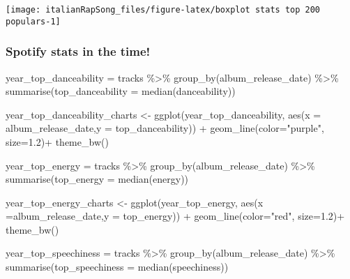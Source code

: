 \documentclass[
]{article}
\newenvironment{Shaded}{\begin{snugshade}}{\end{snugshade}}
\newcommand{\AttributeTok}[1]{\textcolor[rgb]{0.77,0.63,0.00}{#1}}
\newcommand{\FloatTok}[1]{\textcolor[rgb]{0.00,0.00,0.81}{#1}}
\newcommand{\FunctionTok}[1]{\textcolor[rgb]{0.00,0.00,0.00}{#1}}
\newcommand{\NormalTok}[1]{#1}
\newcommand{\OtherTok}[1]{\textcolor[rgb]{0.56,0.35,0.01}{#1}}
\newcommand{\SpecialCharTok}[1]{\textcolor[rgb]{0.00,0.00,0.00}{#1}}
\newcommand{\StringTok}[1]{\textcolor[rgb]{0.31,0.60,0.02}{#1}}
\begin{document}
\begin{center}\texttt{[image: italianRapSong\_files/figure-latex/boxplot stats top 200 populars-1]} \end{center}

\hypertarget{spotify-stats-in-the-time}{%
\subsubsection{Spotify stats in the
time!}\label{spotify-stats-in-the-time}}

\begin{Shaded}
\begin{Highlighting}[]
\NormalTok{year\_top\_danceability }\OtherTok{=}\NormalTok{ tracks }\SpecialCharTok{\%\textgreater{}\%}
  \FunctionTok{group\_by}\NormalTok{(album\_release\_date) }\SpecialCharTok{\%\textgreater{}\%}
  \FunctionTok{summarise}\NormalTok{(}\AttributeTok{top\_danceability =} \FunctionTok{median}\NormalTok{(danceability))}

\NormalTok{year\_top\_danceability\_charts }\OtherTok{\textless{}{-}} \FunctionTok{ggplot}\NormalTok{(year\_top\_danceability, }\FunctionTok{aes}\NormalTok{(}\AttributeTok{x =}\NormalTok{ album\_release\_date,}\AttributeTok{y =}\NormalTok{ top\_danceability)) }\SpecialCharTok{+}
  \FunctionTok{geom\_line}\NormalTok{(}\AttributeTok{color=}\StringTok{"purple"}\NormalTok{, }\AttributeTok{size=}\FloatTok{1.2}\NormalTok{)}\SpecialCharTok{+}
  \FunctionTok{theme\_bw}\NormalTok{()}

\NormalTok{year\_top\_energy }\OtherTok{=}\NormalTok{ tracks }\SpecialCharTok{\%\textgreater{}\%}
  \FunctionTok{group\_by}\NormalTok{(album\_release\_date) }\SpecialCharTok{\%\textgreater{}\%}
  \FunctionTok{summarise}\NormalTok{(}\AttributeTok{top\_energy =} \FunctionTok{median}\NormalTok{(energy))}

\NormalTok{year\_top\_energy\_charts }\OtherTok{\textless{}{-}} \FunctionTok{ggplot}\NormalTok{(year\_top\_energy, }\FunctionTok{aes}\NormalTok{(}\AttributeTok{x =}\NormalTok{album\_release\_date,}\AttributeTok{y =}\NormalTok{ top\_energy)) }\SpecialCharTok{+}
  \FunctionTok{geom\_line}\NormalTok{(}\AttributeTok{color=}\StringTok{"red"}\NormalTok{, }\AttributeTok{size=}\FloatTok{1.2}\NormalTok{)}\SpecialCharTok{+}
  \FunctionTok{theme\_bw}\NormalTok{()}

\NormalTok{year\_top\_speechiness }\OtherTok{=}\NormalTok{ tracks }\SpecialCharTok{\%\textgreater{}\%}
  \FunctionTok{group\_by}\NormalTok{(album\_release\_date) }\SpecialCharTok{\%\textgreater{}\%}
  \FunctionTok{summarise}\NormalTok{(}\AttributeTok{top\_speechiness =} \FunctionTok{median}\NormalTok{(speechiness))}


\end{Highlighting}
\end{Shaded}
\end{document}
